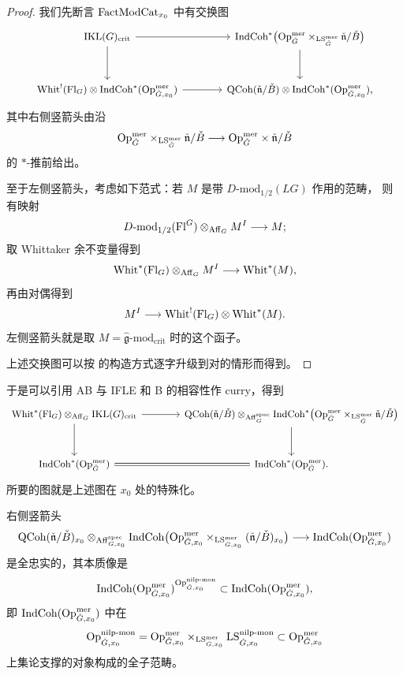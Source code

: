 \begin{proof}
我们先断言 $\mathrm{FactModCat}_{x_0}$ 中有交换图
\[
\begin{tikzcd}[column sep=large,row sep=large,cells={font=\small}]
\IKL(G)_{\crit} \arrow[r] \arrow[d]
& \IndCoh^{*}\bigl(\Op^{\mer}_{\check G}
\times_{\LS^{\mer}_{\check G}}\check{\mathfrak{n}}/\check B\bigr) \arrow[d]\\
\Whit^{!}(\Fl_G)\otimes \IndCoh^{*}(\Op^{\mer}_{\check G,x_0}) \arrow[r] &
\QCoh(\check{\mathfrak{n}}/\check B)\otimes \IndCoh^{*}(\Op^{\mer}_{\check G,x_0}),
\end{tikzcd}
\]
其中右侧竖箭头由沿
\[
\mathrm{Op}^{\mathrm{mer}}_{\check G}\times_{\mathrm{LS}^{\mathrm{mer}}_{\check G}}\check{\mathfrak{n}}/\check B
\longrightarrow \mathrm{Op}^{\mathrm{mer}}_{\check G}\times \check{\mathfrak{n}}/\check B
\]
的 $*$-推前给出。

至于左侧竖箭头，考虑如下范式：若 $M$ 是带 $D\text{-}\mathrm{mod}_{1/2}(LG)$ 作用的范畴，
则有映射
\[
D\text{-}\mathrm{mod}_{1/2}(\mathrm{Fl}^G)\otimes_{\mathrm{Aff}_G}M^{I}\longrightarrow M;
\]
取 Whittaker 余不变量得到
\[
\mathrm{Whit}^{*}(\mathrm{Fl}_G)\otimes_{\mathrm{Aff}_G}M^{I}\longrightarrow \mathrm{Whit}^{*}(M),
\]
再由对偶得到
\[
M^{I}\longrightarrow \mathrm{Whit}^{!}(\mathrm{Fl}_G)\otimes \mathrm{Whit}^{*}(M).
\]
左侧竖箭头就是取 $M=\hat{\mathfrak{g}}\text{-}\mathrm{mod}_{\mathrm{crit}}$ 时的这个函子。

上述交换图可以按 \cite[附录 E.10]{ABC+24a} 的构造方式逐字升级到对的情形而得到。
\end{proof}

于是可以引用 AB 与 IFLE 和 B 的相容性作 curry，得到
\[
\begin{tikzcd}[column sep=large,row sep=large,cells={font=\small}]
\Whit^{*}(\Fl_G)\otimes_{\Aff_G}\IKL(G)_{\crit} \arrow[r] \arrow[d]
& \QCoh(\check{\mathfrak{n}}/\check B)\otimes_{\Aff^{\spec}_G}
\IndCoh^{*}\bigl(\Op^{\mer}_{\check G}
\times_{\LS^{\mer}_{\check G}}\check{\mathfrak{n}}/\check B\bigr) \arrow[d]\\
\IndCoh^{*}(\Op^{\mer}_{\check G}) \arrow[r,equal] &
\IndCoh^{*}(\Op^{\mer}_{\check G}).
\end{tikzcd}
\]
所要的图就是上述图在 $x_0$ 处的特殊化。

\begin{proposition}\label{prop:3.4.4.2}
右侧竖箭头
\[
\mathrm{QCoh}(\check{\mathfrak{n}}/\check B)_{x_0}
\otimes_{\mathrm{Aff}^{\mathrm{spec}}_{G,x_0}}
\mathrm{IndCoh}\bigl(\mathrm{Op}^{\mathrm{mer}}_{\check G,x_0}
\times_{\mathrm{LS}^{\mathrm{mer}}_{\check G,x_0}}(\check{\mathfrak{n}}/\check B)_{x_0}\bigr)
\longrightarrow \mathrm{IndCoh}(\mathrm{Op}^{\mathrm{mer}}_{\check G,x_0})
\]
是全忠实的，其本质像是
\[
\mathrm{IndCoh}(\mathrm{Op}^{\mathrm{mer}}_{\check G,x_0})^{\mathrm{Op}^{\mathrm{nilp\text{-}mon}}_{\check G,x_0}}
\subset \mathrm{IndCoh}(\mathrm{Op}^{\mathrm{mer}}_{\check G,x_0}),
\]
即 $\mathrm{IndCoh}(\mathrm{Op}^{\mathrm{mer}}_{\check G,x_0})$ 中在
\[
\mathrm{Op}^{\mathrm{nilp\text{-}mon}}_{\check G,x_0}
=\mathrm{Op}^{\mathrm{mer}}_{\check G,x_0}
\times_{\mathrm{LS}^{\mathrm{mer}}_{\check G,x_0}}
\mathrm{LS}^{\mathrm{nilp\text{-}mon}}_{\check G,x_0}
\subset \mathrm{Op}^{\mathrm{mer}}_{\check G,x_0}
\]
上集论支撑的对象构成的全子范畴。
\end{proposition}

